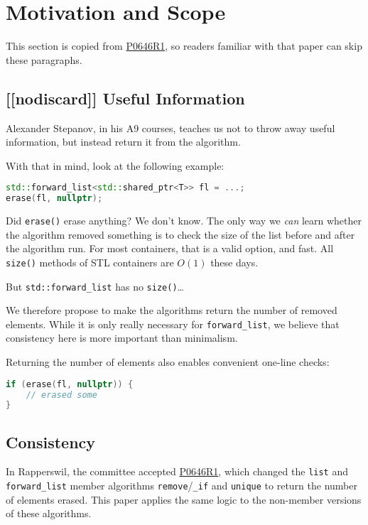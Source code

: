 \documentclass[11pt]{article}
\newcommand{\wgpaper}[1]{\href{https://wg21.link/#1}{#1}}
\begin{document}
\section{Motivation and Scope}

This section is copied from \wgpaper{P0646R1}, so readers familiar
with that paper can skip these paragraphs.

\subsection{[[nodiscard]] Useful Information}

Alexander Stepanov, in his A9 courses\cite{A9}, teaches us not to
throw away useful information, but instead return it from the
algorithm.

With that in mind, look at the following example:
\begin{lstlisting}[language=C++]
std::forward_list<std::shared_ptr<T>> fl = ...;
erase(fl, nullptr);
\end{lstlisting}
Did \texttt{erase()} erase anything? We don't know. The only way we
\emph{can} learn whether the algorithm removed something is to check
the size of the list before and after the algorithm run. For most
containers, that is a valid option, and fast. All \texttt{size()}
methods of STL containers are $O(1)$ these days.

But \texttt{std::forward\_list} has no \texttt{size()}\ldots

We therefore propose to make the algorithms return the number of
removed elements. While it is only really necessary for
\texttt{forward\_list}, we believe that consistency here is more
important than minimalism.

Returning the number of elements also enables convenient one-line
checks:
\begin{lstlisting}[language=C++]
if (erase(fl, nullptr)) {
    // erased some
}
\end{lstlisting}

\subsection{Consistency}

In Rapperswil, the committee accepted \wgpaper{P0646R1}, which changed
the \texttt{list} and \texttt{forward\_list} member algorithms
\texttt{remove}/\texttt{\_if} and \texttt{unique} to return the number
of elements erased. This paper applies the same logic to the
non-member versions of these algorithms.
\end{document}
